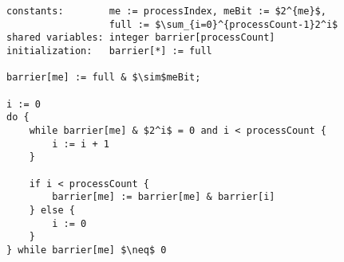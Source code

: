 \begin{lstlisting}[mathescape]
constants:        me := processIndex, meBit := $2^{me}$,
                  full := $\sum_{i=0}^{processCount-1}2^i$
shared variables: integer barrier[processCount]
initialization:   barrier[*] := full

barrier[me] := full & $\sim$meBit;

i := 0
do {
	while barrier[me] & $2^i$ = 0 and i < processCount {
		i := i + 1
	}

	if i < processCount {
		barrier[me] := barrier[me] & barrier[i]
	} else {
		i := 0
	}
} while barrier[me] $\neq$ 0
\end{lstlisting}
